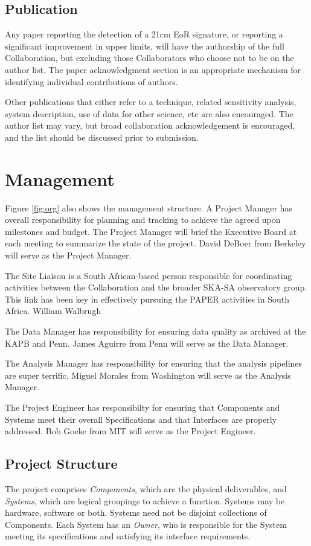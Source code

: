 \documentclass[preprint]{aastex}
\begin{document}
\subsection{Publication}
\label{sec:publication}
Any paper reporting the detection of a 21cm EoR signature, or reporting a significant
improvement in upper limits, will have the authorship of the full Collaboration, but
excluding those Collaborators who choose not to be on the author list. The paper
acknowledgment section is an appropriate mechanism for identifying individual
contributions of authors.

Other publications that either refer to a technique, related sensitivity analysis, system
description, use of data for other science, etc are also encouraged.  The author list
may vary, but broad collaboration acknowledgement is encouraged, and the list should
be discussed prior to submission.

\section{Management}
Figure \ref{fig:org} also shows the management structure.   A Project Manager has
overall responsibility for planning and tracking to achieve the agreed upon
milestones and budget. The Project Manager will brief the Executive Board at each
meeting to summarize the state of the project.  David DeBoer from Berkeley will serve
as the Project Manager.

The Site Liaison is a South African-based person responsible for coordinating activities
between the Collaboration and the broader SKA-SA observatory group.  This link has 
been key in effectively pursuing the PAPER activities in South Africa.  William Walbrugh

The Data Manager has responsibility for ensuring data quality as archived at the KAPB and 
Penn.  James Aguirre from Penn will serve as the Data Manager.

The Analysis Manager has responsibility for ensuring that the analysis pipelines are super terrific.
Miguel Morales from Washington will serve as the Analysis Manager.

The Project Engineer has responsibilty for ensuring that Components and Systems meet their overall
Specifications and that Interfaces are properly addressed.  Bob Goeke from MIT will serve as the
Project Engineer.

\subsection{Project Structure}
The project comprises {\em Components}, which are the physical deliverables, and {\em Systems},
which are logical groupings to achieve a function. Systems may be hardware, software
or both. Systems need not be disjoint collections of Components. Each System has an
{\em Owner}, who is responsible for the System meeting its specifications and satisfying
its interface requirements.
\end{document}
